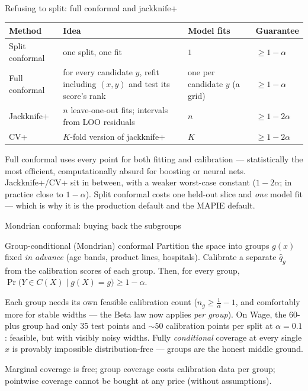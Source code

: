 \documentclass[aspectratio=169,11pt]{beamer}
\begin{document}
\begin{frame}{Refusing to split: full conformal and jackknife+}
  \footnotesize
  \begin{center}
  \begin{tabular}{@{}p{2.6cm}p{4.6cm}p{2.6cm}p{2.6cm}@{}}
    \toprule
    \textbf{Method} & \textbf{Idea} & \textbf{Model fits} & \textbf{Guarantee} \\
    \midrule
    Split conformal & one split, one fit & $1$ & $\ge 1 - \alpha$ \\
    Full conformal & for every candidate $y$, refit including $(x, y)$ and test its
      score's rank & one per candidate $y$ (a grid) & $\ge 1 - \alpha$ \\
    Jackknife+ & $n$ leave-one-out fits; intervals from LOO residuals &
      $n$ & $\ge 1 - 2\alpha$ \\
    CV+ & $K$-fold version of jackknife+ & $K$ & $\ge 1 - 2\alpha$ \\
    \bottomrule
  \end{tabular}
  \end{center}
  \begin{readme}
    Full conformal uses every point for both fitting and calibration --- statistically
    the most efficient, computationally absurd for boosting or neural nets.
    Jackknife+/CV+ sit in between, with a weaker worst-case constant ($1 - 2\alpha$;
    in practice close to $1 - \alpha$). Split conformal costs one held-out slice and
    \emph{one} model fit --- which is why it is the production default and the MAPIE
    default.
  \end{readme}
\end{frame}

\begin{frame}{Mondrian conformal: buying back the subgroups}
  \begin{block}{Group-conditional (Mondrian) conformal}
    Partition the space into groups $g(x)$ fixed \emph{in advance} (age bands, product
    lines, hospitals). Calibrate a separate $\hat q_g$ from the calibration scores of
    each group. Then, for every group,
    $\Pr\big(Y \in C(X) \mid g(X) = g\big) \ge 1 - \alpha$.
  \end{block}
  \begin{readme}
    Each group needs its own feasible calibration count
    ($n_g \ge \tfrac{1}{\alpha} - 1$, and comfortably more for stable widths --- the
    Beta law now applies \emph{per group}). On Wage, the 60-plus group had only 35
    test points and $\sim 50$ calibration points per split at $\alpha = 0.1$: feasible,
    but with visibly noisy widths. Fully \emph{conditional} coverage at every single
    $x$ is provably impossible distribution-free --- groups are the honest middle
    ground.
  \end{readme}
  \begin{takeaway}
    Marginal coverage is free; group coverage costs calibration data per group;
    pointwise coverage cannot be bought at any price (without assumptions).
  \end{takeaway}
\end{frame}
\end{document}
